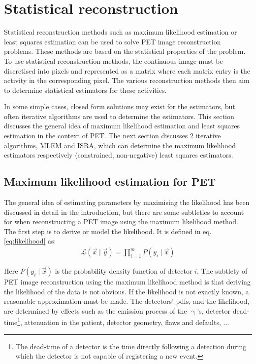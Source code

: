 \documentclass[report,12pt]{report}
\begin{document}
\section{Statistical reconstruction}
Statistical reconstruction methods such as maximum likelihood estimation or least squares estimation can be used to solve PET image reconstruction problems. These methods are based on the statistical properties of the problem. To use statistical reconstruction methods, the continuous image must be discretised into pixels and represented as a matrix where each matrix entry is the activity in the corresponding pixel. The various reconstruction methods then aim to determine statistical estimators for these activities.

In some simple cases, closed form solutions may exist for the estimators, but often iterative algorithms are used to determine the estimators. This section discusses the general idea of maximum likelihood estimation and least squares estimation in the context of PET. The next section discusses 2 iterative algorithms, MLEM and ISRA, which can determine the maximum likelihood estimators respectively (constrained, non-negative) least squares estimators.



\subsection{Maximum likelihood estimation for PET}
The general idea of estimating parameters by maximising the likelihood has been discussed in detail in the introduction, but there are some subtleties to account for when reconstructing a PET image using the maximum likelihood method.\\

The first step is to derive or model the likelihood. It is defined in eq. \ref{eq:likelihood} as:
\begin{align}
	\mathcal{L}(\vec x \mid \vec y) = 
	\prod_{i=1}^{m} P\left( y_i \mid \vec x \right)
\end{align}

Here $P\left( y_i \mid \vec x \right)$ is the probability density function of detector $i$. The subtlety of PET image reconstruction using the maximum likelihood method is that deriving the likelihood of the data is not obvious. If the likelihood is not exactly known, a reasonable approximation must be made. The detectors' pdfs, and the likelihood, are determined by effects such as the emission process of the $\upgamma$'s, detector dead-time\footnote{The dead-time of a detector is the time directly following a detection during which the detector is not capable of registering a new event.}, attenuation in the patient, detector geometry, flaws and defaults, ... 
\end{document}

